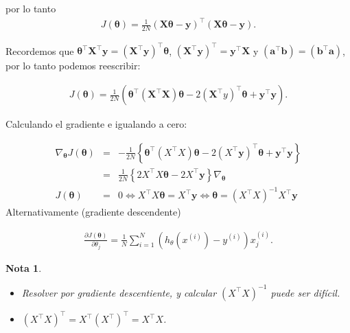 \documentclass[12pt]{article}
\newtheorem{Note}{Nota}%
\begin{document}
por lo tanto
\begin{eqnarray}
J(\mathbf{\theta}) = \frac{1}{2N} (\mathbf{X} \mathbf{\theta} - \mathbf{y})^{\top} (\mathbf{X} \mathbf{\theta} - \mathbf{y}).
\end{eqnarray}

Recordemos que $\mathbf{\theta}^{\top} \mathbf{X}^{\top} \mathbf{y} = (\mathbf{X}^{\top} \mathbf{y})^{\top} \mathbf{\theta}$, $(\mathbf{X}^{\top} \mathbf{y})^{\top} = \mathbf{y}^{\top} \mathbf{X}$ y $(\mathbf{a}^{\top} \mathbf{b}) = (\mathbf{b}^{\top} \mathbf{a})$, por lo tanto podemos reescribir:

\begin{eqnarray}
J(\mathbf{\theta}) = \frac{1}{2N}\left( \mathbf{\theta}^{\top}\left(\mathbf{X}^{\top}\mathbf{X}\right)\mathbf{\theta}- 2\left(\mathbf{X}^{\top}y\right)^{\top}\mathbf{\theta}+ \mathbf{y}^{\top}\mathbf{y}\right).
\end{eqnarray}

Calculando el gradiente e igualando a cero:

\begin{eqnarray*}
\nabla_{\boldsymbol{\theta}} J(\boldsymbol{\theta})&=& -\frac{1}{2N} \left\{ \boldsymbol{\theta}^{\top} (X^{\top}X)\boldsymbol{\theta} - 2(X^{\top} \mathbf{y})^{\top} \boldsymbol{\theta} + \mathbf{y}^{\top} \mathbf{y} \right\}\\
&=& \frac{1}{2N} \left\{ 2 X^{\top} X \boldsymbol{\theta} - 2 X^{\top} \mathbf{y} \right\}
\nabla_{\boldsymbol{\theta}}\\
 J(\boldsymbol{\theta})&=& 0 \Leftrightarrow X^{\top} X \boldsymbol{\theta} = X^{\top} \mathbf{y} \Leftrightarrow \boldsymbol{\theta}= (X^{\top} X)^{-1} X^{\top} \mathbf{y}
\end{eqnarray*}
Alternativamente (gradiente descendente)

\begin{eqnarray*}
\frac{\partial J(\boldsymbol{\theta})}{\partial \theta_j} = \frac{1}{N} \sum_{i=1}^{N} \left( h_{\theta}(x^{(i)}) - y^{(i)} \right) x_j^{(i)}.
\end{eqnarray*}

\begin{Note}
\begin{itemize}
\item Resolver por gradiente descentiente, y calcular $ (X^{\top} X)^{-1}$ puede ser dif\'icil.
\item $(X^{\top} X)^{\top}=X^{\top}(X^{\top})^{\top}=X^{\top} X$.
\end{itemize}
\end{Note}
\end{document}
